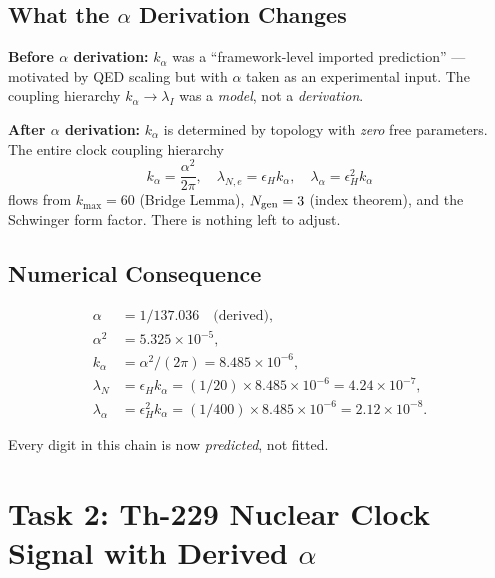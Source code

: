 \documentclass[11pt]{article}
\newcommand{\kalpha}{k_\alpha}
\theoremstyle{definition}
\theoremstyle{remark}
\begin{document}
\subsection{What the $\alpha$ Derivation Changes}

\begin{tcolorbox}[colback=blue!5!white, colframe=blue!60!black,
  title={Paradigm Shift: From Parameter to Prediction}]
\textbf{Before $\alpha$ derivation:} $\kalpha$ was a ``framework-level
imported prediction'' --- motivated by QED scaling but with $\alpha$ taken
as an experimental input. The coupling hierarchy $\kalpha \to \lambda_I$
was a \emph{model}, not a \emph{derivation}.

\textbf{After $\alpha$ derivation:} $\kalpha$ is determined by topology
with \emph{zero} free parameters. The entire clock coupling hierarchy
\[
\kalpha = \frac{\alpha^2}{2\pi}, \quad
\lambda_{N,e} = \epsilon_H \kalpha, \quad
\lambda_\alpha = \epsilon_H^2 \kalpha
\]
flows from $k_{\max} = 60$ (Bridge Lemma), $N_{\rm gen} = 3$ (index
theorem), and the Schwinger form factor. There is nothing left to adjust.
\end{tcolorbox}

\subsection{Numerical Consequence}

\begin{align}
\alpha &= 1/137.036 \quad \text{(derived)}, \\
\alpha^2 &= 5.325 \times 10^{-5}, \\
\kalpha &= \alpha^2/(2\pi) = 8.485 \times 10^{-6}, \\
\lambda_N &= \epsilon_H \kalpha = (1/20) \times 8.485 \times 10^{-6}
          = 4.24 \times 10^{-7}, \\
\lambda_\alpha &= \epsilon_H^2 \kalpha = (1/400) \times 8.485 \times 10^{-6}
               = 2.12 \times 10^{-8}.
\end{align}

Every digit in this chain is now \emph{predicted}, not fitted.

\section{Task 2: Th-229 Nuclear Clock Signal with Derived $\alpha$}
\label{sec:Th229}
\end{document}
